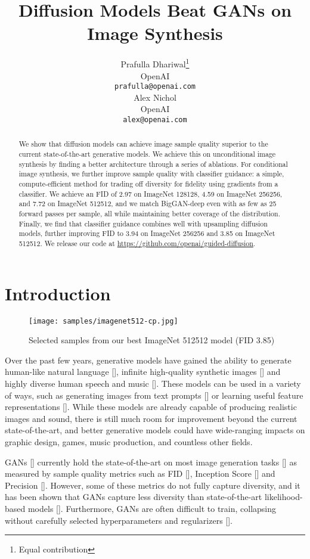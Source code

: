 \documentclass{article}
\title{Diffusion Models Beat GANs on Image Synthesis}
\author{
  Prafulla Dhariwal\thanks{Equal contribution} \\
  OpenAI \\
  \texttt{prafulla@openai.com} \\
  \And
  Alex Nichol\footnotemark[1]\\
  OpenAI \\
  \texttt{alex@openai.com}
}
\newcommand{\shortcite}[1]{[\citenum{#1}]}
\begin{document}
\maketitle

\begin{abstract}
We show that diffusion models can achieve image sample quality superior to the current state-of-the-art generative models. We achieve this on unconditional image synthesis by finding a better architecture through a series of ablations. For conditional image synthesis, we further improve sample quality with classifier guidance: a simple, compute-efficient method for trading off diversity for fidelity using gradients from a classifier. We achieve an FID of 2.97 on ImageNet 128128, 4.59 on ImageNet 256256, and 7.72 on ImageNet 512512, and we match BigGAN-deep even with as few as 25 forward passes per sample, all while maintaining better coverage of the distribution. Finally, we find that classifier guidance combines well with upsampling diffusion models, further improving FID to 3.94 on ImageNet 256256 and 3.85 on ImageNet 512512. We release our code at \url{https://github.com/openai/guided-diffusion}. 
\end{abstract}

\section{Introduction}
\begin{figure}[h!]
    \centerline{\texttt{[image: samples/imagenet512-cp.jpg]}}
    \caption{Selected samples from our best ImageNet 512512 model (FID 3.85)}
    \label{fig:img512-cg-ts}
\end{figure}

Over the past few years, generative models have gained the ability to generate human-like natural language \shortcite{gpt3}, infinite high-quality synthetic images \shortcite{biggan,stylegan2,vqvae2} and highly diverse human speech and music \shortcite{wavenet,jukebox}. These models can be used in a variety of ways, such as generating images from text prompts \shortcite{stackgan,dalle} or learning useful feature representations \shortcite{bigbigan,igpt}. While these models are already capable of producing realistic images and sound, there is still much room for improvement beyond the current state-of-the-art, and better generative models could have wide-ranging impacts on graphic design, games, music production, and countless other fields. 

GANs \shortcite{gan} currently hold the state-of-the-art on most image generation tasks \shortcite{biggan,logan,stylegan2} as measured by sample quality metrics such as FID \shortcite{fid}, Inception Score \shortcite{inceptionscore} and Precision \shortcite{precrecall}. However, some of these metrics do not fully capture diversity, and it has been shown that GANs capture less diversity than state-of-the-art likelihood-based models \shortcite{vqvae2,improved,dctransformer}. Furthermore, GANs are often difficult to train, collapsing without carefully selected hyperparameters and regularizers \shortcite{biggan,sngan,orthoreg}.
\end{document}
